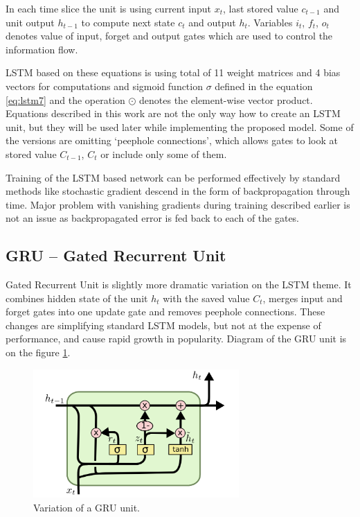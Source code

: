In each time slice the unit is using current input $ x_t $, last stored value $ c_{t-1} $ and unit output $ h_{t-1} $ to compute next state $ c_t $ and output $ h_t $. Variables $ i_t $, $ f_t $, $ o_t $ denotes value of input, forget and output gates which are used to control the information flow.

LSTM based on these equations is using total of 11 weight matrices and 4 bias vectors for computations and sigmoid function $ \sigma $ defined in the equation \eqref{eq:lstm7} and the operation $ \odot $ denotes the element-wise vector product. Equations described in this work are not the only way how to create an LSTM unit, but they will be used later while implementing the proposed model. Some of the versions are omitting \textquoteleft peephole connections\textquoteright, which allows gates to look at stored value $ C_{t-1} $, $ C_t $ or include only some of them.

Training of the LSTM based network can be performed effectively by standard methods like stochastic gradient descend in the form of backpropagation through time. Major problem with vanishing gradients during training described earlier is not an issue as backpropagated error is fed back to each of the gates.


		\subsection{GRU -- Gated Recurrent Unit}\label{subsec:gru}
Gated Recurrent Unit\cite{DBLP:journals/corr/ChoMGBSB14} is slightly more dramatic variation on the LSTM theme. It combines hidden state of the unit $ h_t $ with the saved value $ C_t $, merges input and forget gates into one update gate and removes peephole connections. These changes are simplifying standard LSTM models, but not at the expense of performance, and cause rapid growth in popularity. Diagram of the GRU unit is on the figure \ref{fig:gru}.

\begin{figure}[!ht]
	\centering
	\includegraphics[width=0.7\textwidth]{./fig/LSTM3-var-GRU.png}
	\caption{Variation of a GRU unit.\cite{colah-lstm}
		\label{fig:gru}}
\end{figure}

